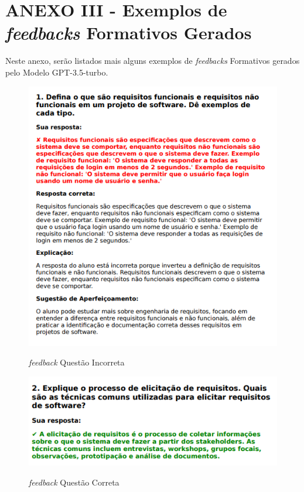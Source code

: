 \chapter*{ANEXO III - Exemplos de \textit{feedbacks} Formativos Gerados}
\label{anexoIIIEFFG}

Neste anexo, serão listados mais alguns exemplos de \textit{feedbacks} Formativos gerados pelo Modelo GPT-3.5-turbo.

\begin{figure}[H]
    \centering
    \caption{\textit{feedback} Questão Incorreta}
    \includegraphics[width=1\textwidth]{figuras/feedback_1.png}
    \label{fig:report_questions}
\end{figure}

\begin{figure}[H]
    \centering
    \caption{\textit{feedback} Questão Correta}
    \includegraphics[width=1\textwidth]{figuras/feedback_2.png}
    \label{fig:report_questions}
\end{figure}

